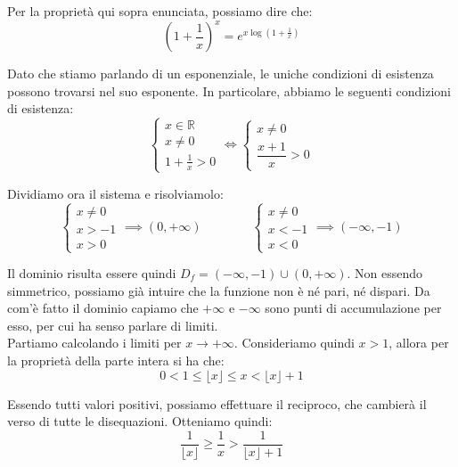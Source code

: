 \documentclass{article}
\begin{document}
\noindent Per la proprietà qui sopra enunciata, possiamo dire che:
\begin{equation*}
    \left(1 + \frac{1}{x}\right)^x = e^{x\log(1 + \frac{1}{x})}
\end{equation*}

\noindent Dato che stiamo parlando di un esponenziale, le uniche condizioni di esistenza possono trovarsi nel suo esponente. In particolare, abbiamo le seguenti condizioni di esistenza:
\begin{equation*}
    \begin{cases}
        x \in \mathbb{R}\\
        x \neq 0 \\
        1 + \frac{1}{x} > 0
    \end{cases}
    \iff
    \begin{cases}
        x \neq 0 \\
        \dfrac{x + 1}{x} > 0
    \end{cases}
\end{equation*}

\noindent Dividiamo ora il sistema e risolviamolo:
\begin{equation*}
    \begin{cases}
        x \neq 0 \\
        x > -1 \\
        x > 0
    \end{cases}
    \implies (0, +\infty) \qquad \qquad
    \begin{cases}
        x \neq 0 \\
        x < -1 \\
        x < 0
    \end{cases}
    \implies (-\infty, -1)
\end{equation*}

\noindent Il dominio risulta essere quindi $D_f = (-\infty, -1) \cup (0, +\infty)$. Non essendo simmetrico, possiamo già intuire che la funzione non è né pari, né dispari. Da com'è fatto il dominio capiamo che $+\infty$ e $-\infty$ sono punti di accumulazione per esso, per cui ha senso parlare di limiti.\\
Partiamo calcolando i limiti per $x \to +\infty$. Consideriamo quindi $x > 1$, allora per la proprietà della parte intera si ha che:
\begin{equation*}
    0 < 1 \leq \lfloor x \rfloor \leq x < \lfloor x \rfloor + 1
\end{equation*}

\noindent Essendo tutti valori positivi, possiamo effettuare il reciproco, che cambierà il verso di tutte le disequazioni. Otteniamo quindi:
\begin{equation*}
    \frac{1}{\lfloor x \rfloor} \geq \frac{1}{x} > \frac{1}{\lfloor x \rfloor + 1}
\end{equation*}
\end{document}
